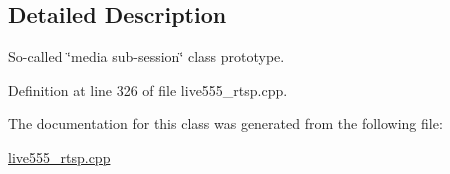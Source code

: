 \subsection{Detailed Description}
So-\/called \char`\"{}media sub-\/session\char`\"{} class prototype. 

Definition at line 326 of file live555\+\_\+rtsp.\+cpp.



The documentation for this class was generated from the following file\+:\begin{DoxyCompactItemize}
\item 
\hyperlink{live555__rtsp_8cpp}{live555\+\_\+rtsp.\+cpp}\end{DoxyCompactItemize}
